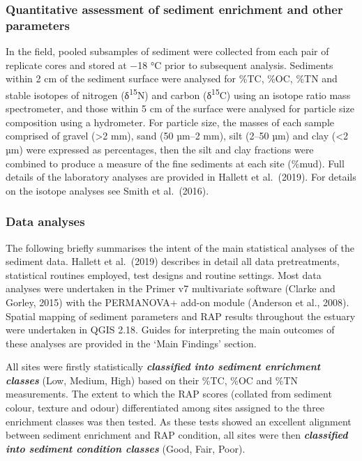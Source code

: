 \documentclass[
]{book}
\begin{document}
\hypertarget{quantitative-assessment-of-sediment-enrichment-and-other-parameters}{%
\subsubsection{Quantitative assessment of sediment enrichment and other parameters}\label{quantitative-assessment-of-sediment-enrichment-and-other-parameters}}

In the field, pooled subsamples of sediment were collected from each pair of replicate cores and stored at −18 °C prior to subsequent analysis. Sediments within 2 cm of the sediment surface were analysed for \%TC, \%OC, \%TN and stable isotopes of nitrogen (δ\textsuperscript{15}N) and carbon (δ\textsuperscript{15}C) using an isotope ratio mass spectrometer, and those within 5 cm of the surface were analysed for particle size composition using a hydrometer. For particle size, the masses of each sample comprised of gravel (\textgreater2 mm), sand (50 µm--2 mm), silt (2--50 µm) and clay (\textless2 µm) were expressed as percentages, then the silt and clay fractions were combined to produce a measure of the fine sediments at each site (\%mud). Full details of the laboratory analyses are provided in Hallett et al.~(2019). For details on the isotope analyses see Smith et al.~(2016).

\hypertarget{data-analyses-2}{%
\subsubsection{Data analyses}\label{data-analyses-2}}

The following briefly summarises the intent of the main statistical analyses of the sediment data. Hallett et al.~(2019) describes in detail all data pretreatments, statistical routines employed, test designs and routine settings. Most data analyses were undertaken in the Primer v7 multivariate software (Clarke and Gorley, 2015) with the PERMANOVA+ add-on module (Anderson et al., 2008). Spatial mapping of sediment parameters and RAP results throughout the estuary were undertaken in QGIS 2.18. Guides for interpreting the main outcomes of these analyses are provided in the `Main Findings' section.

All sites were firstly statistically \textbf{\emph{classified into sediment enrichment classes}} (Low, Medium, High) based on their \%TC, \%OC and \%TN measurements. The extent to which the RAP scores (collated from sediment colour, texture and odour) differentiated among sites assigned to the three enrichment classes was then tested. As these tests showed an excellent alignment between sediment enrichment and RAP condition, all sites were then \textbf{\emph{classified into sediment condition classes}} (Good, Fair, Poor).
\end{document}
